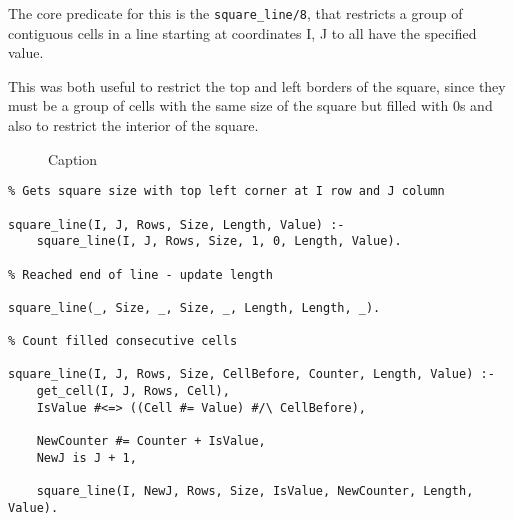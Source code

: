 \documentclass[runningheads]{llncs}
\begin{document}
The core predicate for this is the \texttt{square_line/8}, that restricts a group of contiguous cells in a line starting at coordinates I, J to all have the specified value.

This was both useful to restrict the top and left borders of the square, since they must be a group of cells with the same size of the square but filled with 0s and also to restrict the interior of the square.


\begin{figure}[h!]
    \centering
    \caption{Caption}
    \label{fig:my_label}
\end{figure}

\begin{verbatim}
% Gets square size with top left corner at I row and J column

square_line(I, J, Rows, Size, Length, Value) :-
    square_line(I, J, Rows, Size, 1, 0, Length, Value).

% Reached end of line - update length

square_line(_, Size, _, Size, _, Length, Length, _).

% Count filled consecutive cells

square_line(I, J, Rows, Size, CellBefore, Counter, Length, Value) :-
    get_cell(I, J, Rows, Cell),                        
    IsValue #<=> ((Cell #= Value) #/\ CellBefore),     
    
    NewCounter #= Counter + IsValue,                
    NewJ is J + 1,                                   
    
    square_line(I, NewJ, Rows, Size, IsValue, NewCounter, Length, Value).  
\end{verbatim}
\end{document}
